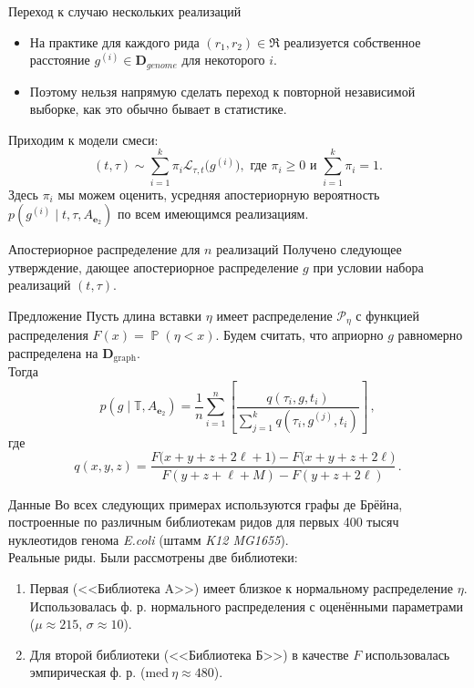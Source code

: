 \documentclass[unicode, notheorems]{beamer}
\DeclareMathOperator{\Prb}{\mathbb{P}}
\begin{document}
\begin{frame}{Переход к случаю нескольких реализаций}
	\begin{itemize}
		\item На практике для каждого рида  $(r_1, r_2) \in \mathfrak{R}$ реализуется собственное расстояние $g^{(i)} \in \mathbf{D}_{genome}$ для некоторого $i$.
		\item Поэтому нельзя напрямую сделать переход к повторной независимой выборке, как это обычно бывает в статистике.
	\end{itemize}
	\medskip
	Приходим к {\color{blue} модели смеси}:
	\begin{equation*}
		(t, \tau) \sim \sum_{i=1}^k \pi_i  \mathcal{L}_{\tau, t} \big(g^{(i)}\big), \text{ где } \pi_i \ge 0 \text{ и } \sum_{i=1}^k \pi_i = 1.
	\end{equation*}
	Здесь $\pi_i$ мы можем оценить, усредняя апостериорную вероятность $p(g^{(i)} \mid t, \tau, A_{\mathbf{e}_2})$ по всем имеющимся реализациям.
\end{frame}

\begin{frame}{Апостериорное распределение для $n$ реализаций}
	Получено следующее утверждение, дающее апостериорное распределение $g$ при условии набора реализаций $(t, \tau)$.
	\begin{block}{Предложение}
		Пусть длина вставки $\eta$ имеет распределение $\mathcal{P}_\eta$ с функцией распределения $F(x) = \Prb(\eta < x)$. Будем считать, что априорно $g$ равномерно распределена на $\mathbf{D}_{\mathrm{graph}}$.\\
		\medskip
		Тогда
		\begin{equation*}
		p(g \mid \mathbb{T}, A_{\mathbf{e}_2}) = \frac{1}{n} \sum_{i = 1}^n \left[ \frac{q(\tau_i, g, t_i)}{\sum_{j=1}^k q(\tau_i, g^{(j)}, t_i)} \right]\,,
		\end{equation*}
		где
		\begin{equation*}
			q(x, y, z)  = \frac{F\big(x+y+z+2\ell+1\big) - F\big(x+y+z+2\ell\big)}{F( y + z + \ell + M) - F(y + z + 2\ell)}\,.
		\end{equation*}
	\end{block}
\end{frame}

\begin{frame}{Данные}
	Во всех следующих примерах используются графы де Брёйна, построенные по различным библиотекам ридов для первых 400 тысяч нуклеотидов генома \textit{E.coli} (штамм \textit{K12 MG1655}).\\
	\medskip
	{\color{blue} Реальные риды.} Были рассмотрены две библиотеки:
	\begin{enumerate}
		\item Первая (<<Библиотека A>>) имеет близкое к нормальному распределение $\eta$. Использовалась ф. р. нормального распределения с оценёнными параметрами ($\mu \approx 215$, $\sigma \approx 10$).
		\item Для второй библиотеки (<<Библиотека Б>>) в качестве $F$ использовалась эмпирическая ф. р. ($\mathrm{med}\ \eta \approx 480$).
	\end{enumerate}
\end{frame}
\end{document}
